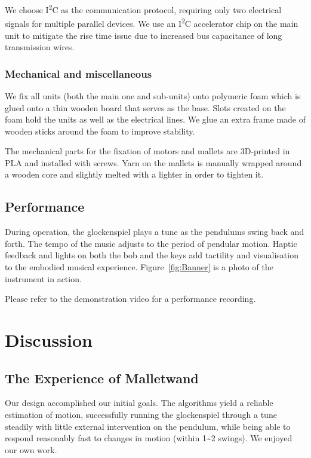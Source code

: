\documentclass{nime-alternate} %
\begin{document}
We choose I\textsuperscript{2}C as the communication protocol, requiring only two electrical signals for multiple parallel devices. We use an I\textsuperscript{2}C accelerator chip on the main unit to mitigate the rise time issue due to increased bus capacitance of long transmission wires.

\subsubsection{Mechanical and miscellaneous}
We fix all units (both the main one and sub-units) onto polymeric foam which is glued onto a thin wooden board that serves as the base. Slots created on the foam hold the units as well as the electrical lines. We glue an extra frame made of wooden sticks around the foam to improve stability.

The mechanical parts for the fixation of motors and mallets are 3D-printed in PLA and installed with screws. Yarn on the mallets is manually wrapped around a wooden core and slightly melted with a lighter in order to tighten it.

\subsection{Performance}
During operation, the glockenspiel plays a tune as the pendulums swing back and forth. The tempo of the music adjusts to the period of pendular motion. Haptic feedback and lights on both the bob and the keys add tactility and visualisation to the embodied musical experience. Figure~\ref{fig:Banner} is a photo of the instrument in action.

Please refer to the demonstration video for a performance recording.

\section{Discussion}

\subsection{The Experience of Malletwand}
Our design accomplished our initial goals. The algorithms yield a reliable estimation of motion, successfully running the glockenspiel through a tune steadily with little external intervention on the pendulum, while being able to respond reasonably fast to changes in motion (within 1\textasciitilde{}2 swings). We enjoyed our own work.
\end{document}
